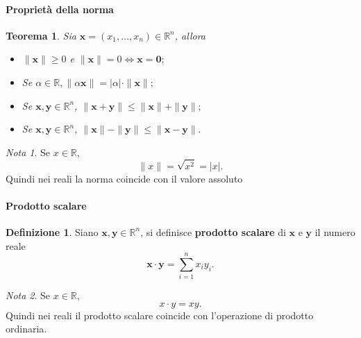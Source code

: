 \documentclass{article}
\theoremstyle{plain}
\newtheorem{thm}{Teorema}[section]
\theoremstyle{definition}
\newtheorem{defn}{Definizione}[section]
\theoremstyle{remark}
\newtheorem{note}{Nota}
\begin{document}
\paragraph{Proprietà della norma}
\begin{bxthm}
\begin{thm}
    Sia $\mathbf{x}=(x_1,\ldots,x_n)\in\mathbb{R}^n$, allora
    \begin{itemize}
        \item $\|\mathbf{x}\|\geq0$ e $\|\mathbf{x}\|=0 \iff \mathbf{x}=\mathbf{0};$
        \item Se $\alpha\in\mathbb{R}, \|\alpha \mathbf{x}\|=|\alpha|\cdot\|\mathbf{x}\|;$
        \item Se $\mathbf{x},\mathbf{y}\in\mathbb{R}^n$, $\|\mathbf{x}+\mathbf{y}\|\leq\|\mathbf{x}\|+\|\mathbf{y}\|;$
        \item Se $\mathbf{x},\mathbf{y}\in\mathbb{R}^n$, $\|\mathbf{x}\|-\|\mathbf{y}\|\leq\|\mathbf{x}-\mathbf{y}\|.$
    \end{itemize}
\end{thm}
\end{bxthm}

\vspace{10pt}

\begin{note}
    Se $x\in\mathbb{R}$, \[\|x\|=\sqrt{x^2}=|x|.\]
    Quindi nei reali la norma coincide con il valore assoluto
\end{note}

\vspace{10pt}

\paragraph{Prodotto scalare}
\begin{bxthm}
\begin{defn}
    Siano $\mathbf{x},\mathbf{y}\in\mathbb{R}^n$, si definisce \textbf{prodotto scalare} di $\mathbf{x}$ e $\mathbf{y}$ il numero reale 
    \[\mathbf{x}\cdot \mathbf{y}=\sum_{i=1}^{n}x_iy_i.\]
\end{defn}
\end{bxthm}

\vspace{10pt}

\begin{note}
    Se $x\in\mathbb{R}$, \[x\cdot y= xy.\]
    Quindi nei reali il prodotto scalare coincide con l'operazione di prodotto ordinaria. 
\end{note}
\end{document}

